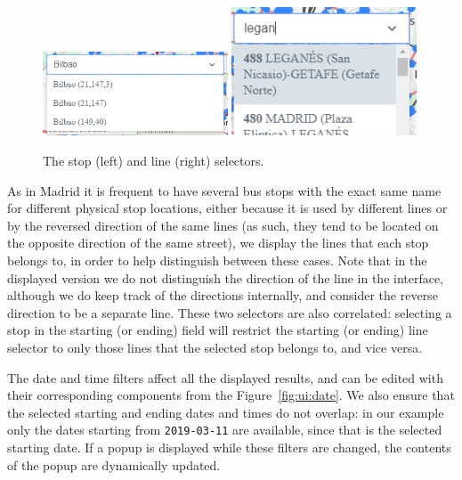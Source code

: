 	\begin{figure}[ht]
		\begin{center}
			{\includegraphics[width=0.49\textwidth]{screens/stop-select_cut.png}}
			{\includegraphics[width=0.49\textwidth]{screens/lines-select_cut.png}}
		\end{center}
		\caption{The stop (left) and line (right) selectors.}
		\label{fig:ui:select}
	\end{figure}
	
	As in Madrid it is frequent to have several bus stops with the exact same name for different physical stop locations, either because it is used by different lines or by the reversed direction of the same lines (as such, they tend to be located on the opposite direction of the same street), we display the lines that each stop belongs to, in order to help distinguish between these cases. Note that in the displayed version we do not distinguish the direction of the line in the interface, although we do keep track of the directions internally, and consider the reverse direction to be a separate line. These two selectors are also correlated: selecting a stop in the starting (or ending) field will restrict the starting (or ending) line selector to only those lines that the selected stop belongs to, and vice versa.
	
	The date and time filters affect all the displayed results, and can be edited with their corresponding components from the Figure~\ref{fig:ui:date}. We also ensure that the selected starting and ending dates and times do not overlap: in our example only the dates starting from \texttt{2019-03-11} are available, since that is the selected starting date. If a popup is displayed while these filters are changed, the contents of the popup are dynamically updated.
	
